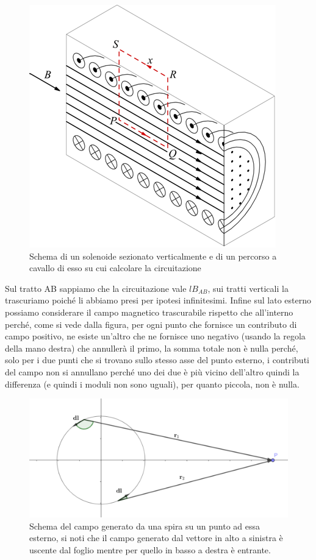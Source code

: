 \documentclass[
10pt, %
a4paper, %
oneside, %
headinclude,footinclude, %
BCOR5mm, %
]{scrartcl}
\begin{document}
\begin{figure}[h!]
	\centering
	\includegraphics[width=0.6\linewidth]{../images/circuitazione_solenoide}
	\caption{Schema di un solenoide sezionato verticalmente e di un percorso a cavallo di esso su cui calcolare la circuitazione}
	\label{fig:circuitazionesolenoide}
\end{figure}
\FloatBarrier
Sul tratto AB sappiamo che la circuitazione vale \(lB_{AB}\), sui tratti verticali la trascuriamo poiché li abbiamo presi per ipotesi infinitesimi. Infine sul lato esterno possiamo considerare il campo magnetico trascurabile rispetto che all'interno perché, come si vede dalla figura, per ogni punto che fornisce un contributo di campo positivo, ne esiste un'altro che ne fornisce uno negativo (usando la regola della mano destra) che annullerà il primo, la somma totale non è nulla perché, solo per i due punti che si trovano sullo stesso asse del punto esterno, i contributi del campo non si annullano perché uno dei due è più vicino dell'altro quindi la differenza (e quindi i moduli non sono uguali), per quanto piccola, non è nulla. 
\begin{figure}[h!]
	\centering
	\includegraphics[width=0.7\linewidth]{../images/campo_esterno_spira}
	\caption{Schema del campo generato da una spira su un punto ad essa esterno, si noti che il campo generato dal vettore in alto a sinistra è uscente dal foglio mentre per quello in basso a destra è entrante.}
	\label{fig:campoesternospira}
\end{figure}
\end{document}
